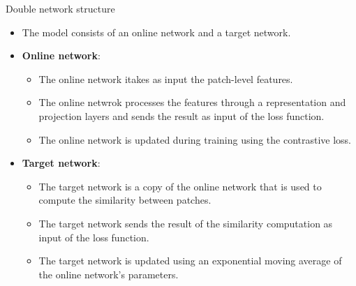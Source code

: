 \documentclass{beamer}
\begin{document}
  \begin{frame}{Double network structure}
      \begin{itemize}
              \item The model consists of  an online network and a target network.
              \item \textbf{Online network}:
                  \begin{itemize}
                          \item  The online network itakes as input the patch-level features.
                          \item The online netwrok processes the features through a representation and projection
                           layers and sends the result as input of the loss function.
                          \item The online network is updated during training using the contrastive loss.
                          
                          
                          \end{itemize}
                  \item \textbf{Target network}:
                          \begin{itemize}
                                \item The target network is a copy of the online network that is used to compute the similarity between patches.
                                \item The target network sends the result of the similarity computation as input of the loss function.
                                \item The target network is updated using an exponential moving average of the online network's parameters.
                                \end{itemize}

                  \end{itemize}
      \end{frame}
\end{document}
